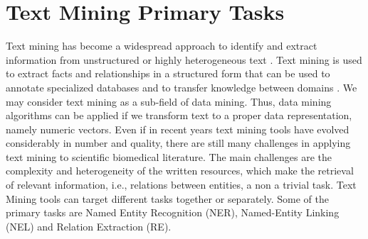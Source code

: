 
\hypertarget{2.2}{\section{Text Mining Primary Tasks}}

Text mining has become a widespread approach to identify and extract information from unstructured or highly heterogeneous text \citep{10.1371/journal.pcbi.1005962}. Text mining is used to extract facts and relationships in a structured form that can be used to annotate specialized databases and to transfer knowledge between domains \citep{FLEUREN201597}. We may consider text mining as a sub-field of data mining. Thus, data mining algorithms can be applied if we transform text to a proper data representation, namely numeric vectors. Even if in recent years text mining tools have evolved considerably in number and quality, there are still many challenges in applying text mining to scientific biomedical literature. The main challenges are the complexity and heterogeneity of the written resources, which make the retrieval of relevant information, i.e., relations between entities, a non a trivial task.
Text Mining tools can target different tasks together or separately. Some of the primary tasks are Named Entity Recognition (NER), Named-Entity Linking (NEL) and Relation Extraction (RE).


